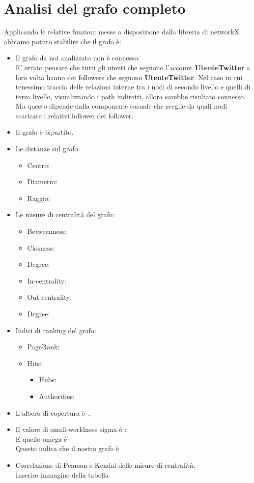 \documentclass[a4paper,11pt]{report}
\begin{document}
\chapter{Analisi del grafo completo}
Applicando le relative funzioni messe a disposizione dalla libreria di networkX abbiamo potuto stabilire che il grafo è:
\begin{itemize}
	\item Il grafo da noi analizzato non è connesso.\\
	E' errato pensare che tutti gli utenti che seguono l'account \textbf{UtenteTwitter} a loro volta hanno dei followers che seguono \textbf{UtenteTwitter}. Nel caso in cui tenessimo traccia delle relazioni interne tra i nodi di secondo livello e quelli di terzo livello, visualizzando i path indiretti, allora sarebbe risultato connesso. Ma questo dipende dalla componente casuale che sceglie da quali nodi scaricare i relativi follower dei follower. 
	\item Il grafo è bipartito.
	\item Le distanze sul grafo:
		\begin{itemize}
			\item Centro: 
			\item Diametro: 
			\item Raggio: 
		\end{itemize}
	
	\item Le misure di centralità del grafo:
		\begin{itemize}
			\item Betweenness: 
			\item Closness: 
			\item Degree: 
			\item In-centrality: 
			\item Out-centrality: 
			\item Degree: 
		\end{itemize}
	
	\item Indici di ranking del grafo:
		\begin{itemize}
			\item PageRank:
			\item Hits: 
				\begin{itemize}
					\item Hubs:
					\item Authorities: 
			\end{itemize}
		\end{itemize}
	\item L'albero di copertura è ..
	\item Il valore di small-worldness sigma è : \\
	E quello omega è \\
	Questo indica che il nostro grafo è
	\item Correlazione di Pearson e Kendal delle misure di centralità:\\ 
	Inserire immagine della tabella 
\end{itemize}
\pagebreak
\end{document}
